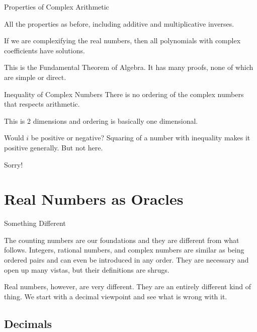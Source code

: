 \documentclass{beamer}
\begin{document}
\begin{frame}{Properties of Complex Arithmetic}

All the properties as before, including additive and multiplicative inverses. 

If we are complexifying the real numbers, then all polynomials with complex coefficients have solutions.

This is the Fundamental Theorem of Algebra. It has many proofs, none of which are simple or direct.  

\end{frame}

\begin{frame}{Inequality of Complex Numbers}
    There is no ordering of the complex numbers that respects arithmetic. 

    This is 2 dimensions and ordering is basically one dimensional. 

    Would $i$ be positive or negative?  Squaring of a number with inequality makes it positive generally. But not here. 

    Sorry!
\end{frame}


\section{Real Numbers as Oracles}

\begin{frame}{Something Different}

The counting numbers are our foundations and they are different from what follows. Integers, rational numbers, and complex numbers are similar as being ordered pairs and can even be introduced in any order. They are necessary and open up many vistas, but their definitions are shrugs. 

Real numbers, however, are very different. They are an entirely different kind of thing. We start with a decimal viewpoint and see what is wrong with it. 

\end{frame}

\subsection{Decimals}
\end{document}
